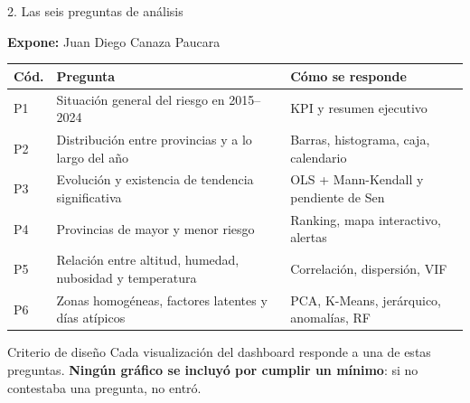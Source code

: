 \documentclass[aspectratio=169,11pt]{beamer}
\newcommand{\ponente}[1]{%
  \begin{flushright}\tiny\textcolor{pnBrandDark}{\textbf{Expone:} #1}\end{flushright}%
  \vspace{-0.9em}%
}
\begin{document}
\begin{frame}{2. Las seis preguntas de análisis}
  \ponente{Juan Diego Canaza Paucara}
  \footnotesize
  \begin{tabular}{@{}p{0.9cm}p{7.0cm}p{4.4cm}@{}}
    \toprule
    \textbf{Cód.} & \textbf{Pregunta} & \textbf{Cómo se responde} \\
    \midrule
    P1 & Situación general del riesgo en 2015–2024 & KPI y resumen ejecutivo \\
    P2 & Distribución entre provincias y a lo largo del año & Barras, histograma, caja, calendario \\
    P3 & Evolución y existencia de tendencia significativa & OLS + Mann-Kendall y pendiente de Sen \\
    P4 & Provincias de mayor y menor riesgo & Ranking, mapa interactivo, alertas \\
    P5 & Relación entre altitud, humedad, nubosidad y temperatura & Correlación, dispersión, VIF \\
    P6 & Zonas homogéneas, factores latentes y días atípicos & PCA, K-Means, jerárquico, anomalías, RF \\
    \bottomrule
  \end{tabular}

  \vspace{0.9em}
  \begin{block}{Criterio de diseño}
    \small Cada visualización del dashboard responde a una de estas preguntas. \textbf{Ningún gráfico
    se incluyó por cumplir un mínimo}: si no contestaba una pregunta, no entró.
  \end{block}
\end{frame}
\end{document}
